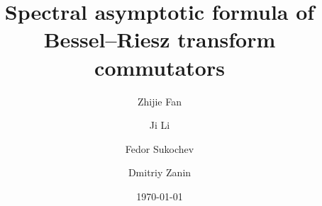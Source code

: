 \documentclass[12pt]{amsart}
\begin{document}
\baselineskip 16.6pt
\hfuzz=6pt

\newtheorem{cl}{Claim}
\newtheorem{theorem}{Theorem}[section]
\newtheorem{proposition}[theorem]{Proposition}
\newtheorem{coro}[theorem]{Corollary}
\newtheorem{lemma}[theorem]{Lemma}
\newtheorem{definition}[theorem]{Definition}
\newtheorem{assum}{Assumption}[section]
\newtheorem{example}[theorem]{Example}
\newtheorem{remark}[theorem]{Remark}
\newtheorem{fact}[theorem]{Fact}
\newtheorem{nota}[theorem]{Notation}
\renewcommand{\theequation}
{\thesection.\arabic{equation}}


\title[Spectral asymptotic formula]{Spectral asymptotic formula of Bessel--Riesz transform commutators}

\author{Zhijie Fan}
\address{Zhijie Fan, School of Mathematical Sciences, South China Normal University, Guangzhou 510631, China}

\author{Ji Li}
\address{Ji Li, School of Mathematical and Physical Sciences, Macquarie University, NSW 2109, Australia}

\author{Fedor Sukochev}
\address{Fedor Sukochev, University of New South Wales, Kensington, NSW 2052, Australia}

\author{Dmitriy Zanin}
\address{Dmitriy Zanin, University of New South Wales, Kensington, NSW 2052, Australia}








\date{\today}



\maketitle
%
%
%
%
\end{document}
